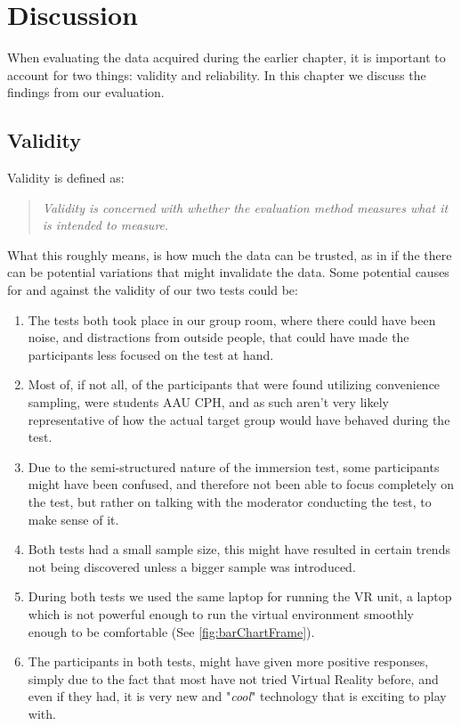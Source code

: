 \chapter{Discussion}
When evaluating the data acquired during the earlier chapter, it is important to account for two things: validity and reliability. In this chapter we discuss the findings from our evaluation.
\section*{Validity}
	Validity is defined as:\\
	\begin{quote}
		\textit{Validity is concerned with whether the evaluation method measures what it is intended to measure}\cite{interactionDesign}.\\
	\end{quote}
	What this roughly means, is how much the data can be trusted, as in if the there can be potential variations that might invalidate the data. Some potential causes for and against the validity of our two tests could be:\\
	\begin{enumerate}
		\item The tests both took place in our group room, where there could have been noise, and distractions from outside people, that could have made the participants less focused on the test at hand.\\
		
		\item Most of, if not all, of the participants that were found utilizing convenience sampling, were students AAU CPH, and as such aren't very likely representative of how the actual target group would have behaved during the test.\\
		
		\item Due to the semi-structured nature of the immersion test, some participants might have been confused, and therefore not been able to focus completely on the test, but rather on talking with the moderator conducting the test, to make sense of it.\\
		
		\item Both tests had a small sample size, this might have resulted in certain trends not being discovered unless a bigger sample was introduced.\\
		
		\item During both tests we used the same laptop for running the VR unit, a laptop which is not powerful enough to run the virtual environment smoothly enough to be comfortable (See \autoref{fig:barChartFrame}).\\
		
		\item The participants in both tests, might have given more positive responses, simply due to the fact that most have not tried Virtual Reality before, and even if they had, it is very new and "\textit{cool}" technology that is exciting to play with.
		
	\end{enumerate}

